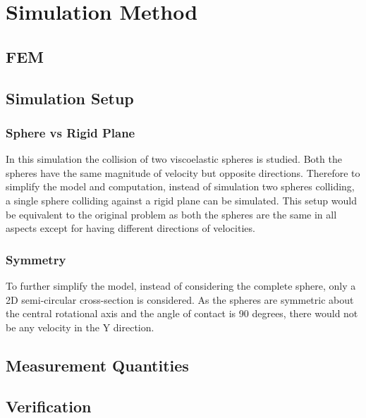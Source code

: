 %
% 
% 


\chapter{Simulation Method}
\label{sec:Simulation Method}

\section{FEM}


\section{Simulation Setup}
\subsection{Sphere vs Rigid Plane}
In this simulation the collision of two viscoelastic spheres is studied. Both the spheres have the same magnitude of velocity but opposite directions. Therefore to simplify the model and computation, instead of simulation two spheres colliding, a single sphere colliding against a rigid plane can be simulated. This setup would be equivalent to the original problem as both the spheres are the same in all aspects except for having different directions of velocities.

\subsection{Symmetry}
To further simplify the model, instead of considering the complete sphere, only a 2D semi-circular cross-section is considered. As the spheres are symmetric about the central rotational axis and the angle of contact is 90 degrees, there would not be any velocity in the Y direction. 

\section{Measurement Quantities}

\section{Verification}
